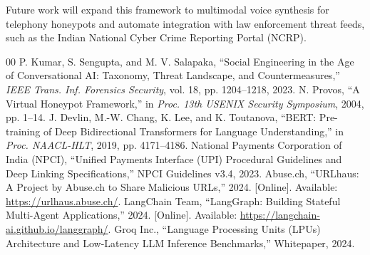 \documentclass[conference]{IEEEtran}
\begin{document}
Future work will expand this framework to multimodal voice synthesis for telephony honeypots and automate integration with law enforcement threat feeds, such as the Indian National Cyber Crime Reporting Portal (NCRP).

\begin{thebibliography}{00}
 P. Kumar, S. Sengupta, and M. V. Salapaka, ``Social Engineering in the Age of Conversational AI: Taxonomy, Threat Landscape, and Countermeasures,'' \textit{IEEE Trans. Inf. Forensics Security}, vol. 18, pp. 1204--1218, 2023.
 N. Provos, ``A Virtual Honeypot Framework,'' in \textit{Proc. 13th USENIX Security Symposium}, 2004, pp. 1--14.
 J. Devlin, M.-W. Chang, K. Lee, and K. Toutanova, ``BERT: Pre-training of Deep Bidirectional Transformers for Language Understanding,'' in \textit{Proc. NAACL-HLT}, 2019, pp. 4171--4186.
 National Payments Corporation of India (NPCI), ``Unified Payments Interface (UPI) Procedural Guidelines and Deep Linking Specifications,'' NPCI Guidelines v3.4, 2023.
 Abuse.ch, ``URLhaus: A Project by Abuse.ch to Share Malicious URLs,'' 2024. [Online]. Available: \url{https://urlhaus.abuse.ch/}.
 LangChain Team, ``LangGraph: Building Stateful Multi-Agent Applications,'' 2024. [Online]. Available: \url{https://langchain-ai.github.io/langgraph/}.
 Groq Inc., ``Language Processing Units (LPUs) Architecture and Low-Latency LLM Inference Benchmarks,'' Whitepaper, 2024.
\end{thebibliography}
\end{document}
